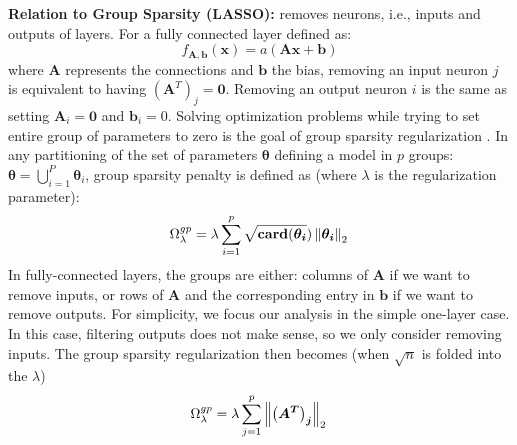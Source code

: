 \noindent\textbf{Relation to Group Sparsity (LASSO): } \shrink removes neurons,
i.e., inputs and outputs of layers. For a fully connected layer defined as:
%
\begin{equation} \label{fully_connected}
  f_{\bm{A}, \bm{b}}(\bm{x})=a(\bm{Ax + b})
\end{equation}
%
where $\bm{A}$ represents the connections and $\bm{b}$ the bias,
removing an input neuron $j$ is equivalent to having $\left(\bm{A}^T\right)_j =
\bm{0}$. Removing an output neuron $i$ is the same as setting $\bm{A}_i = \bm{0}$
and $\bm{b}_i = 0$. Solving optimization problems while trying to set entire
group of parameters to zero is the goal of group sparsity regularization
\cite{Scardapane2017}. 
In  any partitioning of the set of parameters $\bm{\theta}$ defining a model in $p$
groups: $\bm{\theta} = \bigcup_{i=1}^P \bm{\theta}_i$, group sparsity 
penalty is defined as (where $\lambda$ is the regularization parameter): 
%
\begin{equation}
  \Omega_\lambda^{gp} = \lambda \sum_{i=1}^p \sqrt{\mathbf{card}(\bm{\theta_i}}) \left\lVert\bm{\theta_i}\right\rVert_2 \\
\end{equation}
In fully-connected layers, the groups are either: columns of
$\bm{A}$ if we want to remove inputs, or rows of $\bm{A}$ and the corresponding
entry in $\bm{b}$ if we want to remove outputs. For simplicity, we focus
our analysis in the simple one-layer case. In this case, filtering outputs does
not make sense, so we only consider removing inputs. The
group sparsity regularization then becomes (when $\sqrt{n}$ is folded into the $\lambda$)
%
\begin{equation} \label{group_sparsity_regularization}
  \Omega_\lambda^{gp} = \lambda \sum_{j=1}^p \left\lVert\bm{\left(A^T\right)_j}\right\rVert_2 \\
\end{equation}


